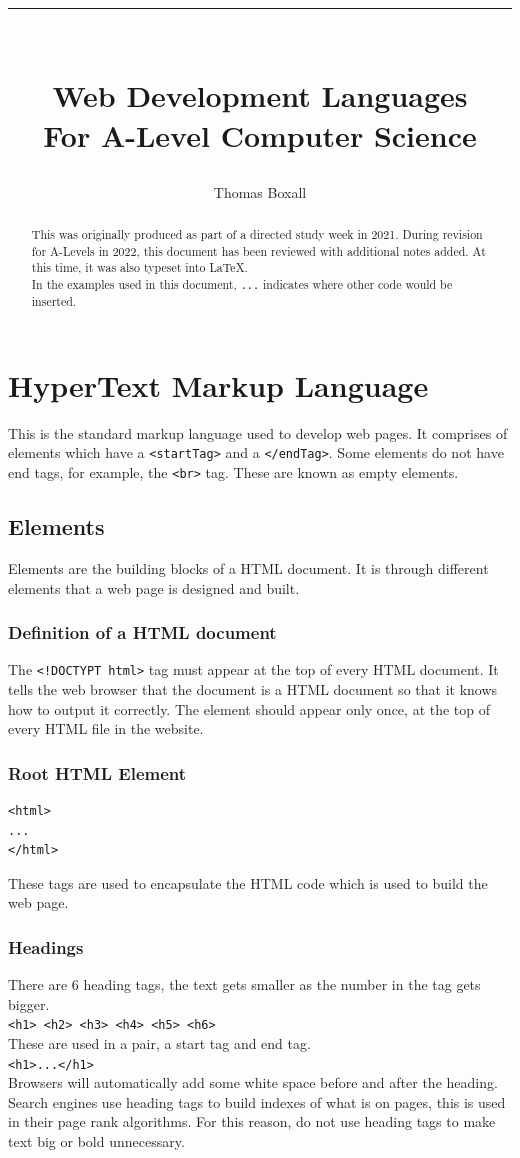 \documentclass{thomasClass}
\title{\noindent \rule{\textwidth}{1pt}\\ [1cm]
    \textbf{\huge Web Development Languages}\\ For A-Level Computer Science}
\author{Thomas Boxall}
\date{February 2021 (Reviewed in April 2022)\\ [1cm]
    \noindent \rule{\textwidth}{1pt}}
\begin{document}
\maketitle

\begin{abstract}
    This was originally produced as part of a directed study week in 2021. During revision for A-Levels in 2022, this document has been reviewed with additional notes added. At this time, it was also typeset into \LaTeX.\\
    In the examples used in this document, \verb|...| indicates where other code would be inserted.
\end{abstract}

\tableofcontents



\chapter{HyperText Markup Language}
This is the standard markup language used to develop web pages. It comprises of elements which have a \verb|<startTag>| and a \verb|</endTag>|. Some elements do not have end tags, for example, the \verb|<br>| tag. These are known as empty elements.

\section{Elements}
Elements are the building blocks of a HTML document. It is through different elements that a web page is designed and built.
\subsection{Definition of a HTML document}
The \verb|<!DOCTYPT html>| tag must appear at the top of every HTML document. It tells the web browser that the document is a HTML document so that it knows how to output it correctly. The element should appear only once, at the top of every HTML file in the website.
\subsection{Root HTML Element}
\begin{verbatim}
<html>
...
</html>
\end{verbatim}
These tags are used to encapsulate the HTML code which is used to build the web page.
\subsection{Headings}
There are 6 heading tags, the text gets smaller as the number in the tag gets bigger.\\
\verb|<h1> <h2> <h3> <h4> <h5> <h6>|\\
These are used in a pair, a start tag and end tag.\\
\verb|<h1>...</h1>|\\
Browsers will automatically add some white space before and after the heading. Search engines use heading tags to build indexes of what is on pages, this is used in their page rank algorithms. For this reason, do not use heading tags to make text big or bold unnecessary.
\end{document}
